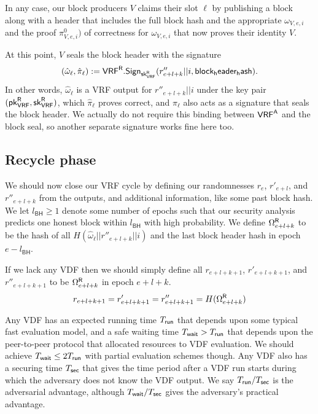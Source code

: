In any case, our block producers $V$ claims their slot $\ell$ by publishing a block along with a header that includes the full block hash and the appropriate $\omega_{V,e,i}$ and the proof $\pi^0_{V,e,i})$ of correctness for $\omega_{V,e,i}$ that now proves their identity $V$.  

At this point, $V$ seals the block header with the signature
$$ (\hat{\omega}_{\ell},\hat{\pi}_{\ell}) := \mathsf{VRF}^{\mathsf{R}}.\mathsf{Sign}_{\mathsf{sk}_{\mathsf{VRF}}^{\mathsf{R}}}(r''_{e+l+k} || i, \mathsf{block_header_hash}) . $$
In other words, $\hat{\omega}_{\ell}$ is a VRF output for $r''_{e+l+k} || i$ under the key pair $(\mathsf{pk}_{\mathsf{VRF}}^{\mathsf{R}},\mathsf{sk}_{\mathsf{VRF}}^{\mathsf{R}})$, which $\hat{\pi}_{\ell}$ proves correct, and $\hat{\pi}_{\ell}$ also acts as a signature that seals the block header.  We actually do not require this binding between $\mathsf{VRF}^{\mathsf{A}}$ and the block seal, so another separate signature works fine here too.


\subsection{Recycle phase}\label{subsec:recycle_phase}
\newcommand\id{\mathsf{id}}
\newcommand{\epochsdelayforblockhash}{l_{\mathsf{BH}}}
\newcommand{\epochsdelayforVDF}{l_{\mathsf{VDF}}}

We should now close our VRF cycle by defining our randomnesses $r_e$, $r'_{e+l}$, and $r''_{e+l+k}$ from the \VRFr outputs, and additional information, like some past block hash.  We let $\epochsdelayforblockhash \ge 1$ denote some number of epochs such that our security analysis predicts one honest block within $\epochsdelayforblockhash$ with high probability.  We define $\Omega^{\mathsf{R}}_{e+l+k}$ to be the hash of all $H(\hat{\omega}_{\ell} || r''_{e+l+k} || i)$ and the last block header hash in epoch $e - \epochsdelayforblockhash$.

If we lack any VDF then we should simply define all $r_{e+l+k+1}$, $r'_{e+l+k+1}$, and $r''_{e+l+k+1}$ to be $\Omega^{\mathsf{R}}_{e+l+k}$ in epoch $e+l+k$.
$$
r_{e+l+k+1} = r'_{e+l+k+1} = r''_{e+l+k+1} = H(\Omega^{\mathsf{R}}_{e+l+k})
$$

Any VDF has an expected running time $T_{\mathsf{run}}$ that depends upon some typical fast evaluation model, and a safe waiting time $T_{\mathsf{wait}} > T_{\mathsf{run}}$ that depends upon the peer-to-peer protocol that allocated resources to VDF evaluation.  We should achieve $T_{\mathsf{wait}} \le 2 T_{\mathsf{run}}$ with partial evaluation schemes though.  Any VDF also has a securing time $T_{\mathsf{sec}}$ that gives the time period after a VDF run starts during which the adversary does not know the VDF output.  We say $T_{\mathsf{run}}/T_{\mathsf{sec}}$ is the adversarial advantage, although $T_{\mathsf{wait}}/T_{\mathsf{sec}}$ gives the adversary's practical advantage.  

